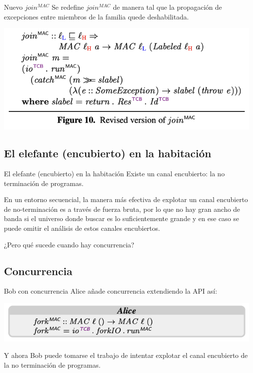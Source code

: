 \documentclass{beamer}
\begin{document}
\begin{frame}{Nuevo $join^{MAC}$}
    Se redefine $join^{MAC}$ de manera tal que la propagación de excepciones entre miembros de la familia quede deshabilitada.

    \begin{center}
        \includegraphics[scale=0.7]{figure10.png}
    \end{center}
\end{frame}

\subsection{El elefante (encubierto) en la habitación}
\begin{frame}{El elefante (encubierto) en la habitación}
    Existe un canal encubierto: la no terminación de programas.

    \vspace{0.5cm}
    En un entorno secuencial, la manera más efectiva de explotar un canal encubierto de no-terminación es a través de fuerza bruta, por lo que no hay gran ancho de banda si el universo donde buscar es lo suficientemente grande y en ese caso se puede omitir el análisis de estos canales encubiertos.

    \vspace{0.5cm}
    \pause
    ¿Pero qué sucede cuando hay concurrencia?
\end{frame}

\subsection{Concurrencia}

\begin{frame}{Bob con concurrencia}
    Alice añade concurrencia extendiendo la API así:

    \begin{center}
        \includegraphics[scale=0.8]{codigo_alice2.png}
    \end{center}

    Y ahora Bob puede tomarse el trabajo de intentar explotar el canal encubierto de la no terminación de programas.
\end{frame}
\end{document}
